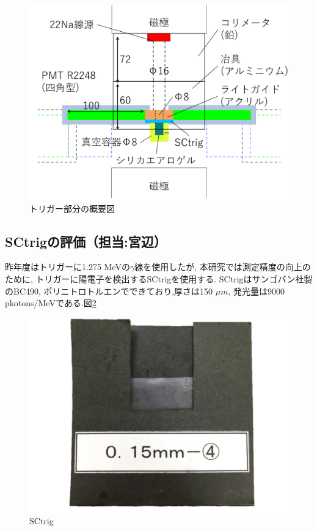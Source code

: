 \begin{figure}[H]
\centering
\includegraphics[keepaspectratio,scale=0.4]{fig/ybm/device4.pdf}
\caption{トリガー部分の概要図}
\label{fig:device3}
\end{figure}


\subsection{SCtrigの評価（担当:宮辺）}

昨年度はトリガーに1.275 MeVの$\gamma$線を使用したが,
本研究では測定精度の向上のために,
トリガーに陽電子を検出するSCtrigを使用する.
SCtrigはサンゴバン社製のBC490,
ポリニトロトルエンでできており,厚さは150 $\si{\mu m}$,
発光量は9000 pkotons/MeVである.図\ref{fig:SCtrig}

\begin{figure}[H]
\centering
\includegraphics[keepaspectratio,scale=0.3]{fig/ybm/SCtrig.pdf}
\caption{SCtrig}
\label{fig:SCtrig}
\end{figure}

